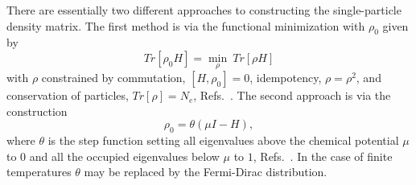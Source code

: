 There are essentially two different approaches to constructing 
the single-particle density matrix. The first method is via 
the functional minimization with $\rho_0$ given by
\begin{equation}
\label{FMin}
Tr[ \rho_0 H ]  = \min_{\rho} ~ Tr[ \rho H ]
\end{equation}
with $\rho$ constrained by commutation, $[H,\rho_0] =0$, idempotency,
$\rho = \rho^2$, and conservation of particles, $Tr [\rho ] = N_e$,
Refs.\ \cite{Sameh82,Li93,Carlsson95,Hernandez96,Kohn96,Daniels97,Yang97,Stephan98,Challacombe99,Haynes99,Bowler99,Daniels99}.
The second approach is via the construction
\begin{equation}
\label{Heavyside}
\rho_0 = \theta ( \mu I - H ),
\end{equation}
where $\theta$ is the step function setting all eigenvalues
above the chemical potential $\mu$ to $0$ and all the occupied eigenvalues
below $\mu$ to $1$, 
Refs.\ \cite{Bowler99,Daniels99,McWeeny60,Goedecker94,Palser98,Beylkin99,Holas01,Niklasson02,Kenney95}.
In the case of finite temperatures $\theta$ may be replaced by the Fermi-Dirac distribution.

